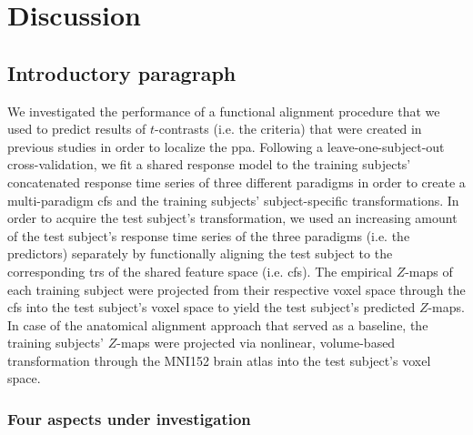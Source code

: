 \pagebreak


\section{Discussion}


\subsection{Introductory paragraph}

%
We investigated the performance of a functional alignment procedure that we used
to predict results of $t$-contrasts (i.e. the criteria) that were created in
previous studies \citep{sengupta2016extension, haeusler2022processing} in order
to localize the \ac{ppa}.
%
Following a leave-one-subject-out cross-validation, we fit a shared response
model \citep{chen2015reduced} to the training subjects' concatenated response
time series of three different paradigms in order to create a multi-paradigm
\ac{cfs} and the training subjects' subject-specific transformations.
%
%
In order to acquire the test subject's transformation, we used an
increasing amount of the test subject's response time series of the three
paradigms (i.e. the predictors)  separately by functionally aligning the test
subject to the corresponding \acp{tr} of the shared feature space (i.e.
\ac{cfs}).
%
The empirical $Z$-maps of each training subject were projected from their
respective voxel space through the \ac{cfs} into the test subject's voxel space
to yield the test subject's predicted $Z$-maps.
%
In case of the anatomical alignment approach that served as a baseline, the
training subjects' $Z$-maps were projected via nonlinear, volume-based
transformation through the MNI152 brain atlas into the test subject's voxel
space.


\subsubsection{Four aspects under investigation}



